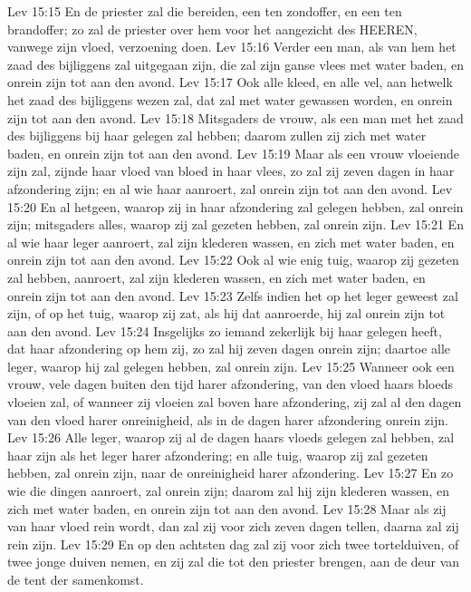 Lev 15:15  En de priester zal die bereiden, een ten zondoffer, en een ten brandoffer; zo zal de priester over hem voor het aangezicht des HEEREN, vanwege zijn vloed, verzoening doen.
Lev 15:16  Verder een man, als van hem het zaad des bijliggens zal uitgegaan zijn, die zal zijn ganse vlees met water baden, en onrein zijn tot aan den avond.
Lev 15:17  Ook alle kleed, en alle vel, aan hetwelk het zaad des bijliggens wezen zal, dat zal met water gewassen worden, en onrein zijn tot aan den avond.
Lev 15:18  Mitsgaders de vrouw, als een man met het zaad des bijliggens bij haar gelegen zal hebben; daarom zullen zij zich met water baden, en onrein zijn tot aan den avond.
Lev 15:19  Maar als een vrouw vloeiende zijn zal, zijnde haar vloed van bloed in haar vlees, zo zal zij zeven dagen in haar afzondering zijn; en al wie haar aanroert, zal onrein zijn tot aan den avond.
Lev 15:20  En al hetgeen, waarop zij in haar afzondering zal gelegen hebben, zal onrein zijn; mitsgaders alles, waarop zij zal gezeten hebben, zal onrein zijn.
Lev 15:21  En al wie haar leger aanroert, zal zijn klederen wassen, en zich met water baden, en onrein zijn tot aan den avond.
Lev 15:22  Ook al wie enig tuig, waarop zij gezeten zal hebben, aanroert, zal zijn klederen wassen, en zich met water baden, en onrein zijn tot aan den avond.
Lev 15:23  Zelfs indien het op het leger geweest zal zijn, of op het tuig, waarop zij zat, als hij dat aanroerde, hij zal onrein zijn tot aan den avond.
Lev 15:24  Insgelijks zo iemand zekerlijk bij haar gelegen heeft, dat haar afzondering op hem zij, zo zal hij zeven dagen onrein zijn; daartoe alle leger, waarop hij zal gelegen hebben, zal onrein zijn.
Lev 15:25  Wanneer ook een vrouw, vele dagen buiten den tijd harer afzondering, van den vloed haars bloeds vloeien zal, of wanneer zij vloeien zal boven hare afzondering, zij zal al den dagen van den vloed harer onreinigheid, als in de dagen harer afzondering onrein zijn.
Lev 15:26  Alle leger, waarop zij al de dagen haars vloeds gelegen zal hebben, zal haar zijn als het leger harer afzondering; en alle tuig, waarop zij zal gezeten hebben, zal onrein zijn, naar de onreinigheid harer afzondering.
Lev 15:27  En zo wie die dingen aanroert, zal onrein zijn; daarom zal hij zijn klederen wassen, en zich met water baden, en onrein zijn tot aan den avond.
Lev 15:28  Maar als zij van haar vloed rein wordt, dan zal zij voor zich zeven dagen tellen, daarna zal zij rein zijn.
Lev 15:29  En op den achtsten dag zal zij voor zich twee tortelduiven, of twee jonge duiven nemen, en zij zal die tot den priester brengen, aan de deur van de tent der samenkomst.
